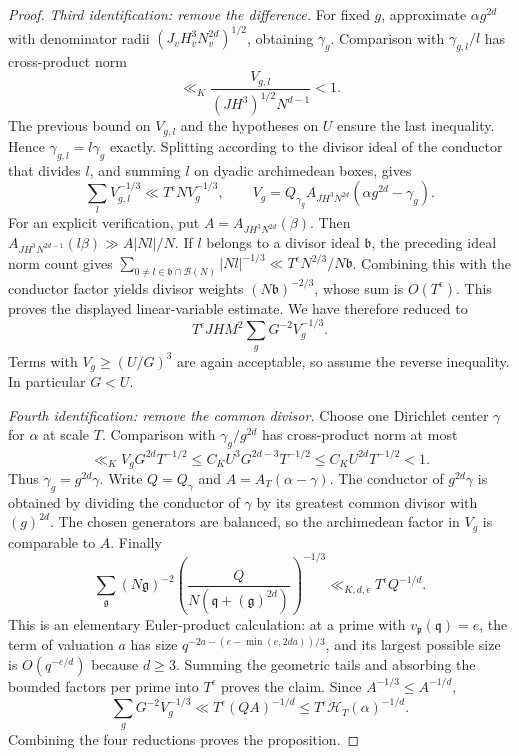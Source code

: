 \documentclass[11pt,reqno]{amsart}
\numberwithin{equation}{section}
\theoremstyle{definition}
\begin{document}
\begin{proof}
\emph{Third identification: remove the difference.}
For fixed $g$, approximate $\alpha g^{2d}$ with denominator radii
$(J_vH_v^3N_v^{2d})^{1/2}$, obtaining $\gamma_g$.
Comparison with $\gamma_{g,l}/l$ has cross-product norm
\[
 \ll_K\frac{V_{g,l}}{(JH^3)^{1/2}N^{d-1}}<1.
\]
The previous bound on $V_{g,l}$ and the hypotheses on $U$ ensure the last
inequality.  Hence $\gamma_{g,l}=l\gamma_g$ exactly.
Splitting according to the divisor ideal of the conductor that divides $l$,
and summing $l$ on dyadic archimedean boxes, gives
\[
 \sum_l V_{g,l}^{-1/3}\ll T^\epsilon N V_g^{-1/3},\qquad
 V_g=Q_{\gamma_g}A_{JH^3N^{2d}}(\alpha g^{2d}-\gamma_g).
\]
For an explicit verification, put $A=A_{JH^3N^{2d}}(\beta)$.
Then $A_{JH^3N^{2d-1}}(l\beta)\gg A|Nl|/N$.
If $l$ belongs to a divisor ideal $\mathfrak b$, the preceding ideal norm
count gives
$\sum_{0\ne l\in\mathfrak b\cap\mathcal B(N)}|Nl|^{-1/3}
\ll T^\epsilon N^{2/3}/N\mathfrak b$.
Combining this with the conductor factor yields divisor weights
$(N\mathfrak b)^{-2/3}$, whose sum is $O(T^\epsilon)$.
This proves the displayed linear-variable estimate.
We have therefore reduced to
\[
 T^\epsilon JHM^2\sum_gG^{-2}V_g^{-1/3}.
\]
Terms with $V_g\ge(U/G)^3$ are again acceptable, so assume the reverse
inequality.  In particular $G<U$.

\emph{Fourth identification: remove the common divisor.}
Choose one Dirichlet center $\gamma$ for $\alpha$ at scale $T$.
Comparison with $\gamma_g/g^{2d}$ has cross-product norm at most
\[
 \ll_K V_gG^{2d}T^{-1/2}
 \le C_KU^3G^{2d-3}T^{-1/2}
 \le C_KU^{2d}T^{-1/2}<1.
\]
Thus $\gamma_g=g^{2d}\gamma$.  Write $Q=Q_\gamma$ and $A=A_T(\alpha-\gamma)$.
The conductor of $g^{2d}\gamma$ is obtained by dividing the conductor of
$\gamma$ by its greatest common divisor with $(g)^{2d}$.
The chosen generators are balanced, so the archimedean factor in $V_g$
is comparable to $A$.
Finally
\[
 \sum_{\mathfrak g}(N\mathfrak g)^{-2}
 \left(\frac{Q}{N(\mathfrak q+(\mathfrak g)^{2d})}\right)^{-1/3}
 \ll_{K,d,\epsilon}T^\epsilon Q^{-1/d}.
\]
This is an elementary Euler-product calculation: at a prime with
$v_\mathfrak p(\mathfrak q)=e$, the term of valuation $a$ has size
$q^{-2a-(e-\min(e,2da))/3}$, and its largest possible size is
$O(q^{-e/d})$ because $d\ge3$.  Summing the geometric tails and absorbing
the bounded factors per prime into $T^\epsilon$ proves the claim.
Since $A^{-1/3}\le A^{-1/d}$,
\[
 \sum_gG^{-2}V_g^{-1/3}\ll T^\epsilon(QA)^{-1/d}
 \le T^\epsilon\mathcal H_T(\alpha)^{-1/d}.
\]
Combining the four reductions proves the proposition.
\end{proof}
\end{document}
